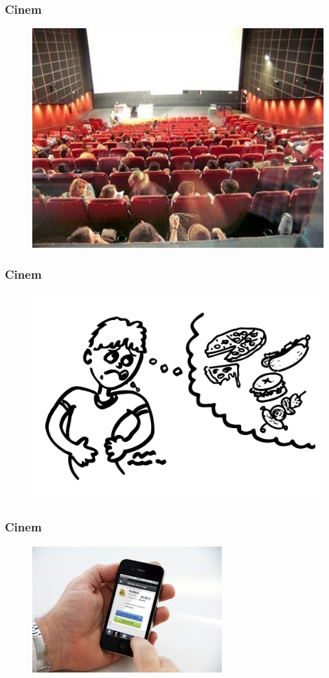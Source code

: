 \documentclass{beamer}
\begin{document}
\begin{frame}[allowframbreaks]
\frametitle{Cinem}
\begin{figure}[h]
\centering
\includegraphics[height=0.5\textheight]{viendopelicula.jpg}
\end{figure}
\end{frame}

\begin{frame}[allowframbreaks]
\frametitle{Cinem}
\begin{figure}[h]
\centering
\includegraphics[height=0.5\textheight]{hambre.jpg}
\end{figure}
\end{frame}

\begin{frame}[allowframbreaks]
\frametitle{Cinem}
\begin{figure}[h]
\centering
\includegraphics[height=0.5\textheight]{appenmovil.jpg}
\end{figure}
\end{frame}
\end{document}
